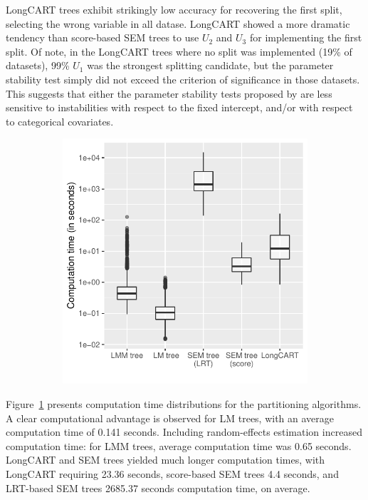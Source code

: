 \documentclass[doc,floatsintext,natbib]{apa7}
\begin{document}
LongCART trees exhibit strikingly low accuracy for recovering the first split, selecting the wrong variable in all datase. LongCART showed a more dramatic tendency than score-based SEM trees to use $U_2$ and $U_3$ for implementing the first split. Of note, in the LongCART trees where no split was implemented (19\% of datasets), 99\% $U_1$ was the strongest splitting candidate, but the parameter stability test simply did not exceed the criterion of significance in those datasets. This suggests that either the parameter stability tests proposed by \cite{KundyHare19} are less sensitive to instabilities with respect to the fixed intercept, and/or with respect to categorical covariates. 




\begin{figure}[!ht]
\caption{Computation time distributions for the different partitioning methods.}
\begin{subfigure}{.6\textwidth}
\includegraphics{_Partitioning_GCMs_with_GLMM_trees-020}
\end{subfigure}
\label{fig:comp_times}
\end{figure}


Figure~\ref{fig:comp_times} presents computation time distributions for the partitioning algorithms. A clear computational advantage is observed for LM trees, with an average computation time of 0.141 seconds. Including random-effects estimation increased computation time: for LMM trees, average computation time was 0.65 seconds. LongCART and SEM trees yielded much longer computation times, with LongCART requiring 23.36 seconds, score-based SEM trees 4.4 seconds, and LRT-based SEM trees 2685.37 seconds computation time, on average. 
\end{document}
